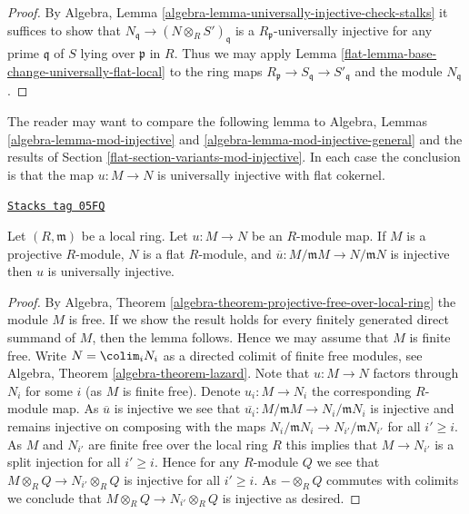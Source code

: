 \begin{proof}

By
Algebra, Lemma \ref{algebra-lemma-universally-injective-check-stalks}
it suffices to show that $N_{\mathfrak q} \to (N \otimes_R S')_{\mathfrak q}$
is a $R_{\mathfrak p}$-universally injective for any prime $\mathfrak q$
of $S$ lying over $\mathfrak p$ in $R$. Thus we may apply
Lemma \ref{flat-lemma-base-change-universally-flat-local}
to the ring maps
$R_{\mathfrak p} \to S_{\mathfrak q} \to S'_{\mathfrak q}$
and the module $N_{\mathfrak q}$.
\end{proof}

The reader may want to compare the following lemma to
Algebra, Lemmas \ref{algebra-lemma-mod-injective} and
\ref{algebra-lemma-mod-injective-general} and the results of
Section \ref{flat-section-variants-mod-injective}.
In each case the conclusion is that the map $u : M \to N$ is
universally injective with flat cokernel.

\begin{lemma}
\label{flat-lemma-universally-injective-local}
\href{https://stacks.math.columbia.edu/tag/05FQ}{\texttt{Stacks tag 05FQ}}

Let $(R, \mathfrak m)$ be a local ring. Let $u : M \to N$ be an $R$-module map.
If $M$ is a projective $R$-module, $N$ is a flat $R$-module, and
$\overline{u} : M/\mathfrak mM \to N/\mathfrak mN$ is injective
then $u$ is universally injective.
\end{lemma}

\begin{proof}
By
Algebra, Theorem \ref{algebra-theorem-projective-free-over-local-ring}
the module $M$ is free. If we show the result holds for every finitely
generated direct summand of $M$, then the lemma follows. Hence we may
assume that $M$ is finite free. Write $N = \colim_i N_i$ as
a directed colimit of finite free modules, see
Algebra, Theorem \ref{algebra-theorem-lazard}.
Note that $u : M \to N$ factors through $N_i$ for some $i$ (as $M$ is finite
free). Denote $u_i : M \to N_i$ the corresponding $R$-module map.
As $\overline{u}$ is injective we see that
$\overline{u_i} : M/\mathfrak mM \to N_i/\mathfrak mN_i$ is
injective and remains injective on composing with the maps
$N_i/\mathfrak mN_i \to N_{i'}/\mathfrak mN_{i'}$ for all $i' \geq i$.
As $M$ and $N_{i'}$ are finite free over the local ring $R$ this implies
that $M \to N_{i'}$ is a split injection for all $i' \geq i$. Hence
for any $R$-module $Q$ we see that $M \otimes_R Q \to N_{i'} \otimes_R Q$
is injective for all $i' \geq i$. As $- \otimes_R Q$ commutes with
colimits we conclude that $M \otimes_R Q \to N_{i'} \otimes_R Q$
is injective as desired.
\end{proof}

